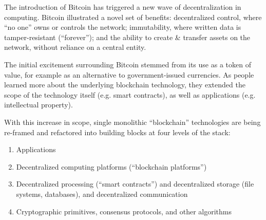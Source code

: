 The introduction of Bitcoin \cite{nakamoto2009bitcoin} has triggered a new wave of decentralization in computing. 
Bitcoin illustrated a novel set of benefits: decentralized control, where ``no one'' owns or controls the network; immutability,
where written data is tamper-resistant (``forever''); and the ability to create \& transfer assets on the network, without reliance on a central entity.

The initial excitement surrounding Bitcoin stemmed from its use as a token of value, for example as an alternative to government-issued currencies.
As people learned more about the underlying blockchain technology, they extended the scope of the technology itself (e.g. smart contracts), as well as applications (e.g. intellectual property).

With this increase in scope, single monolithic ``blockchain'' technologies are being re-framed and refactored into building blocks at four levels of the stack:
\begin{enumerate}
 \item Applications
 \item Decentralized computing platforms (``blockchain platforms'')
 \item Decentralized processing (``smart contracts'') and decentralized storage (file systems, databases), and decentralized communication
 \item Cryptographic primitives, consensus protocols, and other algorithms
\end{enumerate}


